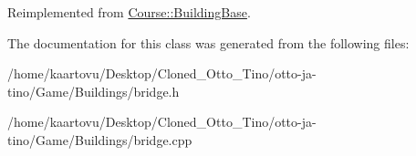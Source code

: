 Reimplemented from \hyperlink{class_course_1_1_building_base_ac2cc44e08dc73d05b1617bf71295baaf}{Course\-::\-Building\-Base}.



The documentation for this class was generated from the following files\-:\begin{DoxyCompactItemize}
\item 
/home/kaartovu/\-Desktop/\-Cloned\-\_\-\-Otto\-\_\-\-Tino/otto-\/ja-\/tino/\-Game/\-Buildings/bridge.\-h\item 
/home/kaartovu/\-Desktop/\-Cloned\-\_\-\-Otto\-\_\-\-Tino/otto-\/ja-\/tino/\-Game/\-Buildings/bridge.\-cpp\end{DoxyCompactItemize}
